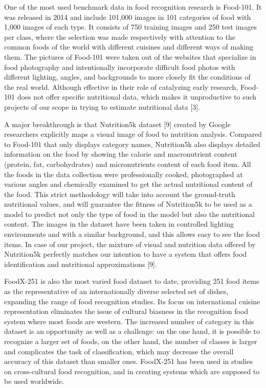 \documentclass[12pt, openany]{report}
\begin{document}
One of the most used benchmark data in food recognition research is Food-101. It was released in 2014 and include 101,000 images in 101 categories of food with 1,000 images of each type. It consists of 750 training images and 250 test images per class, where the selection was made respectively with attention to the common foods of the world with different cuisines and different ways of making them. The pictures of Food-101 were taken out of the websites that specialize in food photography and intentionally incorporate difficult food photos with different lighting, angles, and backgrounds to more closely fit the conditions of the real world. Although effective in their role of catalyzing early research, Food-101 does not offer specific nutritional data, which makes it unproductive to such projects of our scope in trying to estimate nutritional data [3].

A major breakthrough is that Nutrition5k dataset [9] created by Google researchers explicitly maps a visual image of food to nutrition analysis. Compared to Food-101 that only displays category names, Nutrition5k also displays detailed information on the food by showing the calorie and macronutrient content (protein, fat, carbohydrates) and micronutrients content of each food item. All the foods in the data collection were professionally cooked, photographed at various angles and chemically examined to get the actual nutritional content of the food. This strict methodology will take into account the ground-truth nutritional values, and will guarantee the fitness of Nutrition5k to be used as a model to predict not only the type of food in the model but also the nutritional content. The images in the dataset have been taken in controlled lighting environments and with a similar background, and this allows easy to see the food items. In case of our project, the mixture of visual and nutrition data offered by Nutrition5k perfectly matches our intention to have a system that offers food identification and nutritional approximations [9].

FoodX-251 is also the most varied food dataset to date, providing 251 food items as the representative of an internationally diverse selected set of dishes, expanding the range of food recognition studies. Its focus on international cuisine representation eliminates the issue of cultural biasness in the recognition food system where most foods are western. The increased number of category in this dataset is an opportunity as well as a challenge: on the one hand, it is possible to recognize a larger set of foods, on the other hand, the number of classes is larger and complicates the task of classification, which may decrease the overall accuracy of this dataset than smaller ones. FoodX-251 has been used in studies on cross-cultural food recognition, and in creating systems which are supposed to be used worldwide.
\end{document}
